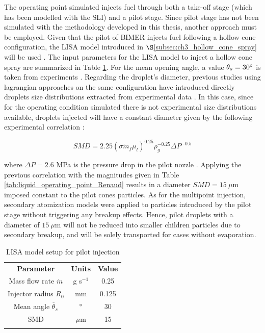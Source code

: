 The operating point simulated injects fuel through both a take-off stage (which has been modelled with the SLI) and a pilot stage. Since pilot stage has not been simulated with the methodology developed in this thesis, another approach must be employed. Given that the pilot of BIMER injects fuel following a hollow cone configuration, the LISA model introduced in $\S$\ref{subsec:ch3_hollow_cone_spray} will be used .   The input parameters for the LISA model to inject a hollow cone spray are summarized in Table \ref{tab:LISA_model_parameters}. For the mean opening angle, a value $\theta_s = 30 \degree$ is taken from experiments . Regarding the droplet's diameter, previous studies using lagrangian approaches on the same configuration have introduced directly droplets size distributions extracted from experimental data . In this case, since for the operating condition simulated there is not experimental size distributions available, droplets injected will have a constant diameter given by the following experimental correlation :

\begin{equation}
SMD = 2.25 \left( \sigma \dot{m}_f \mu_l \right)^{0.25} \rho_g^{-0.25}  \Delta P^{-0.5}
\end{equation}

where $\Delta P = 2.6$ MPa is the pressure drop in the pilot nozzle . Applying the previous correlation with the magnitudes given in Table \ref{tab:liquid_operating_point_Renaud} results in a diameter $SMD = 15~\mu$m imposed constant to the pilot cones particles. As for the multipoint injection, secondary atomization models were applied to  particles introduced by the pilot stage without triggering any breakup effects. Hence, pilot droplets with a diameter of $15~\mu$m will not be reduced into smaller children particles due to secondary breakup, and will be solely transported for cases without evaporation. 



\begin{table}[!h]
\centering
\caption{LISA model setup for pilot injection}
\begin{tabular}{ccc}
\thickhline
\textbf{Parameter} & \textbf{Units} &  \textbf{Value} \\
\thickhline
Mass flow rate $\dot{m}$ & g s$^{-1}$ & 0.25 \\
Injector radius $R_0$ & mm & 0.125 \\
Mean angle $\overline{\theta}_s$ & $\degree$ & 30  \\
SMD & $\mu$m & 15 \\
\thickhline
\end{tabular}
\label{tab:LISA_model_parameters}
\end{table}




